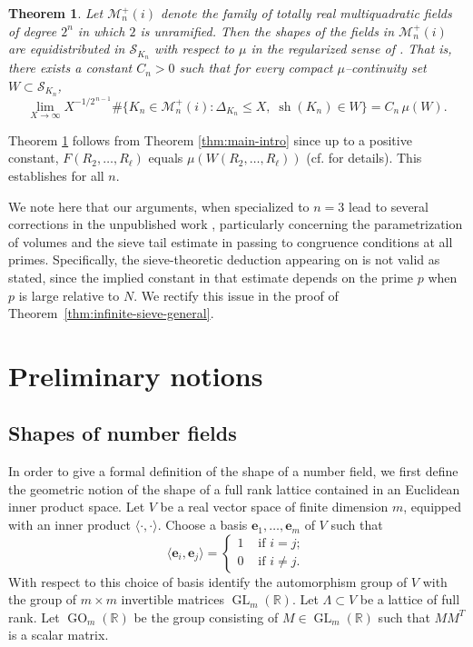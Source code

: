 \documentclass{amsart}
\newcommand{\op}[1]{\operatorname{#1}}
\theoremstyle{plain}
\newtheorem{theorem}{Theorem}[section]
\theoremstyle{definition}
\theoremstyle{remark}
\numberwithin{equation}{section}
\begin{document}
\begin{theorem}\label{thm:equidistribution}
Let $\mathcal{M}_n^{+}(i)$ denote the family of totally real
multiquadratic fields of degree $2^n$ in which $2$ is unramified.
Then the shapes of the fields in $\mathcal{M}_n^{+}(i)$ are
equidistributed in $\mathcal{S}_{K_n}$ with respect to $\mu$ in the
regularized sense of \cite[Conjecture~1.1]{Hassan}.  That is, there
exists a constant $C_n>0$ such that for every compact
$\mu$--continuity set $W\subset\mathcal{S}_{K_n}$,
\[
\lim_{X\to\infty}
X^{-1/2^{\,n-1}}
\#\{K_n\in\mathcal{M}_n^{+}(i):
\Delta_{K_n}\le X,\;
\operatorname{sh}(K_n)\in W\}
=
C_n\,\mu(W).
\]
\end{theorem}
Theorem \ref{thm:equidistribution} follows from Theorem \ref{thm:main-intro} since up to a positive constant, $F(R_2, \dots, R_\ell)$ equals $\mu\left(W(R_2, \dots, R_\ell)\right)$ (cf. \cite[section 2.4]{Hassan} for details). This establishes
\cite[Conjecture~1.1]{Hassan} for all $n$.
\par We note here that our arguments, when specialized to $n=3$ lead to several corrections in the unpublished work \cite{Hassan},
particularly concerning the parametrization of volumes and the sieve tail estimate in passing to congruence conditions at all primes.
Specifically, the sieve-theoretic deduction appearing on
\cite[line~6, p.~54]{Hassan} is not valid as stated, since the implied
constant in that estimate depends on the prime $p$ when $p$ is large
relative to $N$. We rectify this issue in the proof of
Theorem~\ref{thm:infinite-sieve-general}.
\section{Preliminary notions} 
\subsection{Shapes of number fields} \label{sec:shapes_notion}
In order to give a formal definition of the shape of a number field, we first define the geometric notion of the shape of a full rank lattice contained in an Euclidean inner product space. Let $V$ be a real vector space of finite dimension $m$, equipped with an inner product $\langle \cdot, \cdot \rangle$. Choose a basis $\mathbf{e}_1, \dots, \mathbf{e}_m$ of $V$ such that 
\[\langle \mathbf e_i, \mathbf e_j\rangle =\begin{cases}
    1 & \text{ if }i=j;\\
    0 & \text{ if }i\neq j.
\end{cases}\] With respect to this choice of basis identify the automorphism group of $V$ with the group of $m\times m$ invertible matrices $\op{GL}_m(\mathbb{R})$. Let $\Lambda \subset V$ be a lattice of full rank. Let $\operatorname{GO}_m(\mathbb{R})$ be the group consisting of $M\in \op{GL}_m(\mathbb{R})$ such that $M M^T$ is a scalar matrix.
\end{document}
